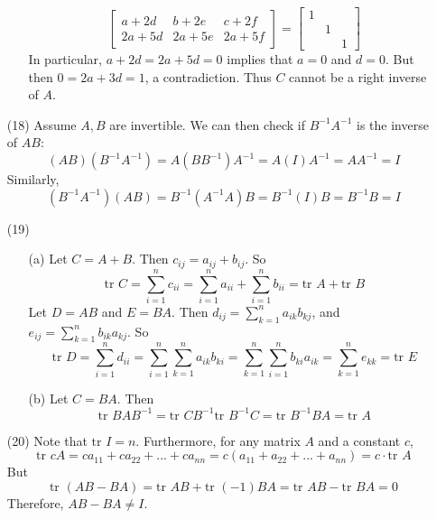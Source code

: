 \begin{itemize}
\begin{itemize}
$$\begin{bmatrix}
a + 2d & b + 2e & c + 2f \\
2a + 5d & 2a + 5e & 2a + 5f
\end{bmatrix} = \begin{bmatrix}
1 & & \\
& 1 & \\
& & 1
\end{bmatrix} $$
In particular, $a + 2d = 2a + 5d = 0$ implies that $a = 0$ and $d = 0$. But then $0 = 2a + 3d = 1$, a contradiction. Thus $C$ cannot be a right inverse of $A$.
\end{itemize}
\item[(18)]
Assume $A, B$ are invertible. We can then check if $B^{-1}A^{-1}$ is the inverse of $AB$:
$$(AB)(B^{-1}A^{-1}) = A(BB^{-1})A^{-1} = A(I)A^{-1} = AA^{-1} = I$$
Similarly,
$$(B^{-1}A^{-1})(AB) = B^{-1}(A^{-1}A)B = B^{-1}(I)B = B^{-1}B = I$$
\item[(19)]
\begin{itemize}
\item[(a)]
Let $C = A + B$. Then $c_{ij} = a_{ij} + b_{ij}$. So
$$\text{tr }C = \sum_{i=1}^n c_{ii} = \sum_{i=1}^n a_{ii} + \sum_{i=1}^n b_{ii} = \text{tr }A + \text{tr }B$$
Let $D = AB$ and $E = BA$. Then $d_{ij} = \sum_{k=1}^n a_{ik}b_{kj}$, and $e_{ij} = \sum_{k=1}^n b_{ik}a_{kj}$. So
$$\text{tr }D = \sum_{i = 1}^n d_{ii} = \sum_{i=1}^n\sum_{k=1}^n a_{ik}b_{ki} = \sum_{k=1}^n\sum_{i=1}^n b_{ki}a_{ik} = \sum_{k=1}^n e_{kk} = \text{tr }E$$
\item[(b)]
Let $C = BA$. Then
$$\text{tr }BAB^{-1} = \text{tr }CB^{-1} \text{tr }B^{-1}C = \text{tr }B^{-1}BA = \text{tr }A$$
\end{itemize}
\item[(20)]
Note that $\text{tr }I = n$. Furthermore, for any matrix $A$ and a constant $c$, 
$$\text{tr }cA = ca_{11} + ca_{22} + ... + ca_{nn} = c(a_{11} + a_{22} + ... + a_{nn}) = c \cdot \text{tr }A$$ 
But
$$\text{tr }(AB - BA) = \text{tr }AB + \text{tr }(-1)BA = \text{tr }AB - \text{tr }BA = 0$$
Therefore, $AB - BA \neq I$.
\end{itemize}
